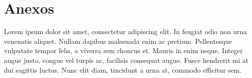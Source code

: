 \documentclass[letterpaper,twoside,10pt]{report}
\begin{document}









\appendix
\clearpage

\chapter{Anexos}\label{anexo}

Lorem ipsum dolor sit amet, consectetur adipiscing elit. In feugiat odio non urna venenatis aliquet. Nullam dapibus malesuada enim ac pretium. Pellentesque vulputate tempor felis, a viverra sem rhoncus et. Mauris in enim neque. Integer augue justo, congue vel turpis ac, facilisis consequat augue. Fusce hendrerit mi at dui sagittis luctus. Nunc elit diam, tincidunt a urna at, commodo efficitur sem.
\end{document}
